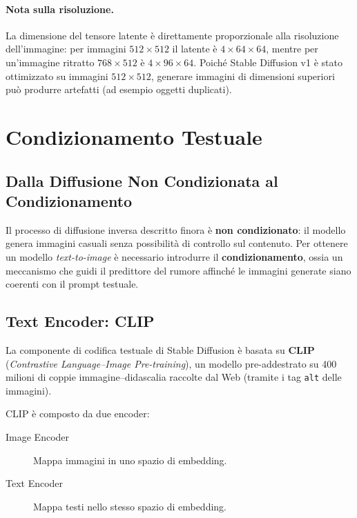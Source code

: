\paragraph{Nota sulla risoluzione.} La dimensione del tensore latente
è direttamente proporzionale alla risoluzione dell'immagine: per
immagini $512\times512$ il latente è $4\times64\times64$, mentre per
un'immagine ritratto $768\times512$ è $4\times96\times64$. Poiché
Stable Diffusion v1 è stato ottimizzato su immagini $512\times512$,
generare immagini di dimensioni superiori può produrre artefatti
(ad esempio oggetti duplicati).

\section{Condizionamento Testuale}
\label{sec:text-conditioning}

\subsection{Dalla Diffusione Non Condizionata al Condizionamento}
\label{subsec:conditioning-intro}

Il processo di diffusione inversa descritto finora è \textbf{non
condizionato}: il modello genera immagini casuali senza possibilità
di controllo sul contenuto. Per ottenere un modello \emph{text-to-image}
è necessario introdurre il \textbf{condizionamento}, ossia un meccanismo
che guidi il predittore del rumore affinché le immagini generate siano
coerenti con il prompt testuale.

\subsection{Text Encoder: CLIP}
\label{subsec:clip}

La componente di codifica testuale di Stable Diffusion è basata su
\textbf{CLIP} (\emph{Contrastive Language–Image Pre-training}), un
modello pre-addestrato su 400 milioni di coppie immagine--didascalia
raccolte dal Web (tramite i tag \texttt{alt} delle immagini).

CLIP è composto da due encoder:
\begin{description}
  \item[Image Encoder] Mappa immagini in uno spazio di embedding.
  \item[Text Encoder] Mappa testi nello stesso spazio di embedding.
\end{description}

